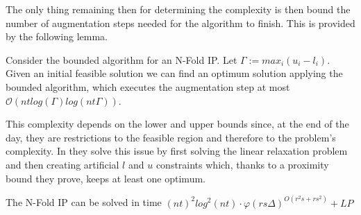 The only thing remaining then for determining the complexity is then bound the number of augmentation steps needed for the algorithm to finish. This is provided by the following lemma.

\begin{lemma}
Consider the bounded algorithm for an N-Fold IP. Let $\Gamma := max_i(u_i - l_i)$. Given an initial feasible solution we can find an optimum solution applying the bounded algorithm, which executes the augmentation step at most $\mathcal{O}(nt log(\Gamma)log(nt\Gamma))$.  
\end{lemma}

This complexity depends on the lower and upper bounds since, at the end of the day, they are restrictions to the feasible region and therefore to the problem's complexity. In \cite{EISENBRAND:2018} they solve this issue by first solving the linear relaxation problem and then creating artificial $l$ and $u$ constraints which, thanks to a proximity bound they prove, keeps at least one optimum.

\begin{lemma}
    The N-Fold IP can be solved in time $(nt)^2 log^2(nt) \cdot \varphi (rs\Delta)^{O(r^2s + rs^2)} + LP$
\end{lemma}
        